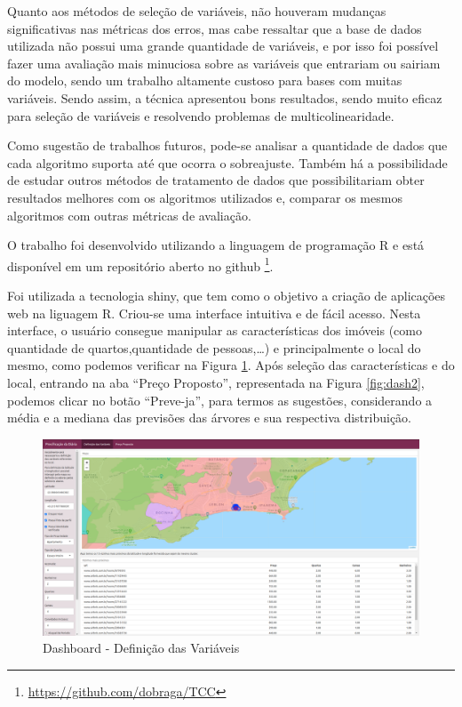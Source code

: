 \documentclass[
	12pt,				%
	a4paper,		%
	oneside,    %
	chapter=TITLE,		   %
	section=TITLE,		   %
	subsection=TITLE,	   %
	subsubsection=TITLE, %
	english,			%
	french,				%
	spanish,			%
	brazil,				%
]{abntex2}
\begin{document}
Quanto aos métodos de seleção de variáveis, não houveram mudanças
significativas nas métricas dos erros, mas cabe ressaltar que a base de
dados utilizada não possui uma grande quantidade de variáveis, e por
isso foi possível fazer uma avaliação mais minuciosa sobre as variáveis
que entrariam ou sairiam do modelo, sendo um trabalho altamente custoso
para bases com muitas variáveis. Sendo assim, a técnica apresentou bons
resultados, sendo muito eficaz para seleção de variáveis e resolvendo
problemas de multicolinearidade.

Como sugestão de trabalhos futuros, pode-se analisar a quantidade de
dados que cada algoritmo suporta até que ocorra o sobreajuste. Também há
a possibilidade de estudar outros métodos de tratamento de dados que
possibilitariam obter resultados melhores com os algoritmos utilizados
e, comparar os mesmos algoritmos com outras métricas de avaliação.

O trabalho foi desenvolvido utilizando a linguagem de programação R e
está disponível em um repositório aberto no github
\footnote{\url{https://github.com/dobraga/TCC}}.

Foi utilizada a tecnologia shiny, que tem como o objetivo a criação de
aplicações web na liguagem R. Criou-se uma interface intuitiva e de
fácil acesso. Nesta interface, o usuário consegue manipular as
características dos imóveis (como quantidade de quartos,quantidade de
pessoas,\ldots) e principalmente o local do mesmo, como podemos
verificar na Figura \ref{fig:dash1}. Após seleção das características e
do local, entrando na aba ``Preço Proposto'', representada na Figura
\ref{fig:dash2}, podemos clicar no botão ``Preve-ja'', para termos as
sugestões, considerando a média e a mediana das previsões das árvores e
sua respectiva distribuição.

\begin{figure}
\centering
\includegraphics[width=\textwidth,height=0.3\textheight]{../fig/dash1.png}
\caption{Dashboard - Definição das Variáveis\label{fig:dash1}}
\end{figure}
\end{document}
